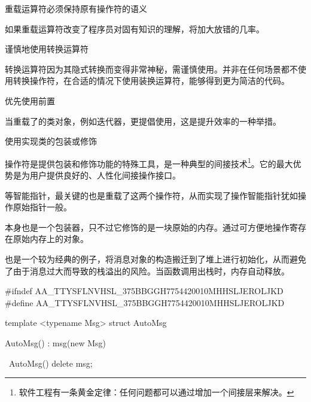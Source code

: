 \begin{content}

\begin{regulation}
重载运算符必须保持原有操作符的语义
\end{regulation}

如果重载运算符改变了程序员对固有知识的理解，将加大放错的几率。

\begin{regulation}
谨慎地使用转换运算符
\end{regulation}

转换运算符因为其隐式转换而变得非常神秘，需谨慎使用。并非在任何场景都不使用转换操作符，在合适的情况下使用装换运算符，能够得到更为简洁的代码。

\begin{regulation}
优先使用前置
\end{regulation}

当重载了的类对象，例如迭代器，更提倡使用，这是提升效率的一种举措。

\begin{regulation}
使用实现类的包装或修饰
\end{regulation}

操作符是提供包装和修饰功能的特殊工具，是一种典型的间接技术\footnote{软件工程有一条黄金定律：任何问题都可以通过增加一个间接层来解决。}。它的最大优势是为用户提供良好的、人性化间接操作接口。

等智能指针，最关键的也是重载了这两个操作符，从而实现了操作智能指针犹如操作原始指针一般。

本身也是一个包装器，只不过它修饰的是一块原始的内存。通过可方便地操作寄存在原始内存上的对象。

也是一个较为经典的例子，将消息对象的构造搬迁到了堆上进行初始化，从而避免了由于消息过大而导致的栈溢出的风险。当函数调用出栈时，内存自动释放。

\begin{leftbar}
\begin{c++}[caption={base/AutoMsg.h}]
#ifndef AA_TTYSFLNVHSL_375BBGGH7754420010MHHSLJEROLJKD
#define AA_TTYSFLNVHSL_375BBGGH7754420010MHHSLJEROLJKD

template <typename Msg>
struct AutoMsg
{
    AutoMsg() : msg(new Msg)
    {}
    
    ~AutoMsg()
    {
        delete msg;
    }
    
}
\end{c++}
\end{leftbar}
\end{content}

